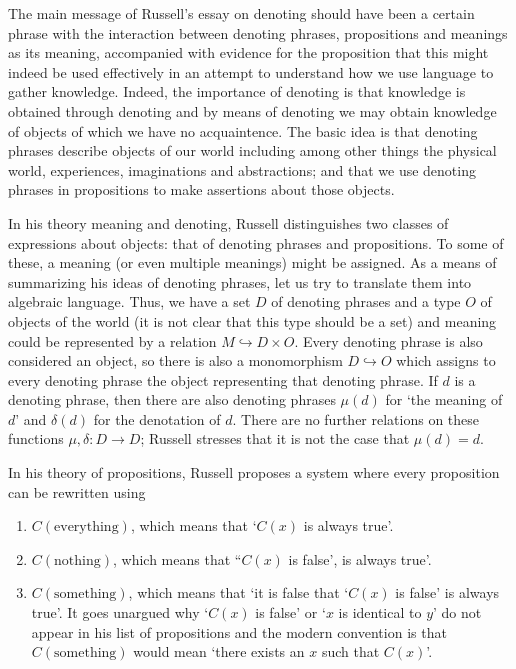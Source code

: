 \documentclass{article}
\begin{document}
\maketitle

The main message of Russell's essay on denoting should have been a certain
phrase with the interaction between denoting phrases, propositions and meanings
as its meaning, accompanied with evidence for the proposition that this might
indeed be used effectively in an attempt to understand how we use language to 
gather knowledge. Indeed, the importance of denoting is that knowledge
is obtained through denoting and by means of denoting we may obtain knowledge
of objects of which we have no acquaintence. The basic idea is that denoting
phrases describe objects of our world including among other things the physical 
world, experiences, imaginations and abstractions; and that we use denoting 
phrases in propositions to make assertions about those objects.

In his theory meaning and denoting, Russell distinguishes two classes of
expressions about objects: that of denoting phrases and
propositions. To some of these, a meaning (or even multiple meanings) might be
assigned. As a means of summarizing his ideas of denoting phrases, let us try
to translate them into algebraic language. Thus, we have a set $D$ of denoting
phrases and a type $O$ of objects of the world (it is not clear that this type
should be a set) and meaning could be represented by a relation 
$M\hookrightarrow D\times O$. Every denoting phrase is also considered an
object, so there is also a monomorphism $D \hookrightarrow O$ which assigns to
every denoting phrase the object representing that denoting phrase. If $d$ is
a denoting phrase, then there are also denoting phrases $\mu(d)$ for `the meaning
of $d$' and $\delta(d)$ for the denotation of $d$. There are no further relations
on these functions $\mu,\delta:D\to D$; Russell stresses that it is not the case
that $\mu(d)=d$. 

In his theory of propositions, Russell proposes a system where every
proposition can be rewritten using
\begin{enumerate}
\item $C(\text{everything})$, which means that `$C(x)$ is always true'.
\item $C(\text{nothing})$, which means that ``$C(x)$ is false', is always true'.
\item $C(\text{something})$, which means that `it is false that `$C(x)$ is
false' is always true'. It goes unargued why `$C(x)$ is false' or `$x$ is
identical to $y$' do not appear in his list of propositions and the modern
convention is that $C(\text{something})$ would mean `there exists an $x$ such
that $C(x)$'. 
\end{enumerate}
\end{document}
